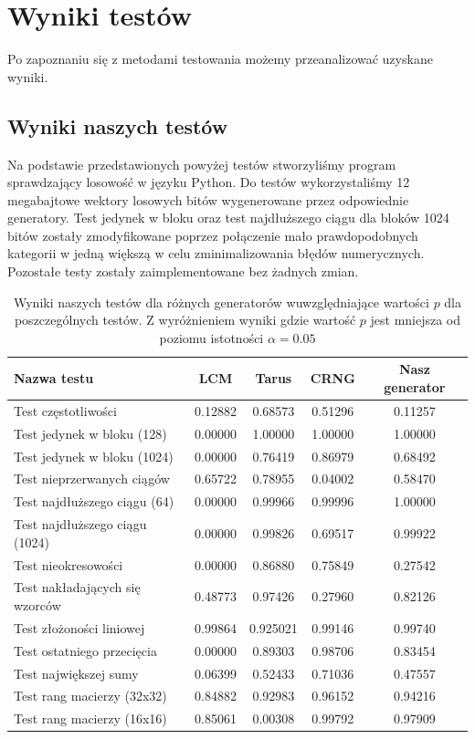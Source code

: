 \section{Wyniki testów}
Po zapoznaniu się z metodami testowania możemy przeanalizować uzyskane wyniki.
\subsection{Wyniki naszych testów}
Na podstawie przedstawionych powyżej testów stworzyliśmy program sprawdzający losowość w języku Python. Do testów wykorzystaliśmy 12 megabajtowe wektory losowych bitów wygenerowane przez odpowiednie generatory. Test jedynek w bloku oraz test najdłuższego ciągu dla bloków 1024 bitów zostały zmodyfikowane poprzez połączenie mało prawdopodobnych kategorii w jedną większą w celu zminimalizowania błędów numerycznych. Pozostałe testy zostały zaimplementowane bez żadnych zmian.
\begin{table}[!ht]
    \centering
    \begin{tabular}{|l|c|c|c|c|}
    \hline
        \textbf{Nazwa testu} & \textbf{LCM} & \textbf{Tarus} & \textbf{CRNG} & \textbf{Nasz generator} \\ \hline
        Test częstotliwości & 0.12882 & 0.68573 & 0.51296 & 0.11257 \\ \hline
        Test jedynek w bloku (128) & \cellcolor{lred} 0.00000 & 1.00000 & 1.00000 & 1.00000 \\ \hline
        Test jedynek w bloku (1024) & \cellcolor{lred}0.00000 & 0.76419 & 0.86979 & 0.68492 \\ \hline
        Test nieprzerwanych ciągów & 0.65722 & 0.78955 & \cellcolor{lred}0.04002 & 0.58470 \\ \hline
        Test najdłuższego ciągu (64) & \cellcolor{lred}0.00000 & 0.99966 & 0.99996 & 1.00000 \\ \hline
        Test najdłuższego ciągu (1024) & \cellcolor{lred}0.00000 & 0.99826 & 0.69517 & 0.99922 \\ \hline
        Test nieokresowości & \cellcolor{lred}0.00000 & 0.86880 & 0.75849 & 0.27542 \\ \hline
        Test nakładających się wzorców & 0.48773& 0.97426& 0.27960& 0.82126 \\ \hline
        Test złożoności liniowej & 0.99864 & 0.925021 & 0.99146 & 0.99740 \\ \hline
        Test ostatniego przecięcia & \cellcolor{lred}0.00000 & 0.89303 & 0.98706 & 0.83454 \\ \hline
        Test największej sumy & 0.06399 & 0.52433 & 0.71036 & 0.47557 \\ \hline
        Test rang macierzy (32x32) & 0.84882 & 0.92983 & 0.96152 & 0.94216 \\ \hline
        Test rang macierzy (16x16) & 0.85061 & \cellcolor{lred}0.00308 & 0.99792 & 0.97909 \\ \hline
    \end{tabular}
    \caption{\label{tab:my_res}Wyniki naszych testów dla różnych generatorów wuwzględniające wartości $p$ dla poszczególnych testów. Z wyróżnieniem wyniki gdzie wartość $p$ jest mniejsza od poziomu istotności $\alpha = 0.05$}
\end{table}
